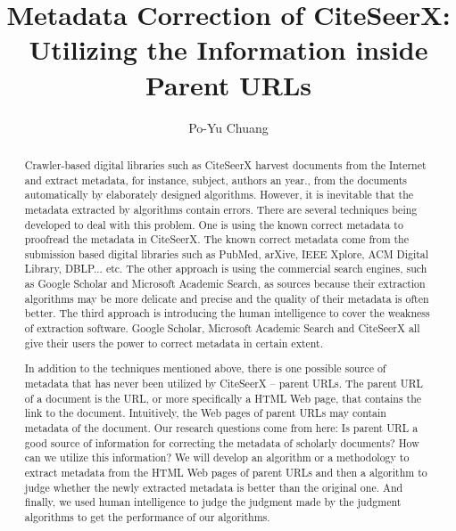 \documentclass[prodmode]{acmsmall} %
\begin{document}

\title{Metadata Correction of CiteSeerX: Utilizing the Information inside Parent URLs}
\author{
Po-Yu Chuang
}

\begin{abstract}
Crawler-based digital libraries such as CiteSeerX harvest documents from the Internet and extract metadata, for instance, subject, authors an year., from the documents automatically by elaborately designed algorithms. However, it is inevitable that the metadata extracted by algorithms contain errors. There are several techniques being developed to deal with this problem. One is using the known correct metadata to proofread the metadata in CiteSeerX. The known correct metadata come from the submission based digital libraries such as PubMed, arXive, IEEE Xplore, ACM Digital Library, DBLP... etc. The other approach is using the commercial search engines, such as Google Scholar and Microsoft Academic Search, as sources because their extraction algorithms may be more delicate and precise and the quality of their metadata is often better. The third approach is introducing the human intelligence to cover the weakness of extraction software. Google Scholar, Microsoft Academic Search and CiteSeerX all give their users the power to correct metadata in certain extent.

In addition to the techniques mentioned above, there is one possible source of metadata that has never been utilized by CiteSeerX -- parent URLs. The parent URL of a document is the URL, or more specifically a HTML Web page, that contains the link to the document. Intuitively, the Web pages of parent URLs may contain metadata of the document. Our research questions come from here:  Is parent URL a good source of information for correcting the metadata of scholarly documents? How can we utilize this information? We will develop an algorithm or a methodology to extract metadata from the HTML Web pages of parent URLs and then a algorithm to judge whether the newly extracted metadata is better than the original one. And finally, we used human intelligence to judge the judgment made by the judgment algorithms to get the performance of our algorithms.
\end{abstract}

\maketitle
\end{document}
